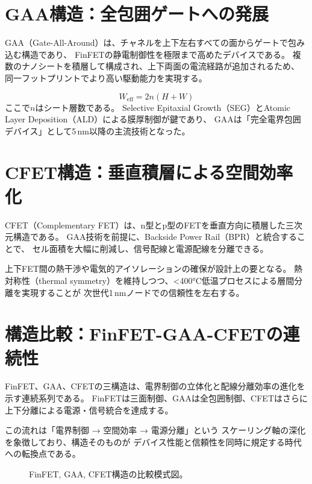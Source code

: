 \section{GAA構造：全包囲ゲートへの発展}
GAA（Gate-All-Around）は、チャネルを上下左右すべての面からゲートで包み込む構造であり、  
FinFETの静電制御性を極限まで高めたデバイスである。  
複数のナノシートを積層して構成され、上下両面の電流経路が追加されるため、  
同一フットプリントでより高い駆動能力を実現する。

\[
W_{\mathrm{eff}} = 2n(H + W)
\]
ここで$n$はシート層数である。  
Selective Epitaxial Growth（SEG）とAtomic Layer Deposition（ALD）による膜厚制御が鍵であり、  
GAAは「完全電界包囲デバイス」として5\,nm以降の主流技術となった。



\section{CFET構造：垂直積層による空間効率化}
CFET（Complementary FET）は、n型とp型のFETを垂直方向に積層した三次元構造である。  
GAA技術を前提に、Backside Power Rail（BPR）と統合することで、  
セル面積を大幅に削減し、信号配線と電源配線を分離できる。  

上下FET間の熱干渉や電気的アイソレーションの確保が設計上の要となる。  
熱対称性（thermal symmetry）を維持しつつ、<400°C低温プロセスによる層間分離を実現することが  
次世代1\,nmノードでの信頼性を左右する。



\section{構造比較：FinFET-GAA-CFETの連続性}
FinFET、GAA、CFETの三構造は、電界制御の立体化と配線分離効率の進化を示す連続系列である。  
FinFETは三面制御、GAAは全包囲制御、CFETはさらに上下分離による電源・信号統合を達成する。  

この流れは「電界制御 → 空間効率 → 電源分離」という  
スケーリング軸の深化を象徴しており、構造そのものが  
デバイス性能と信頼性を同時に規定する時代への転換点である。

\begin{figure}[t]
  \centering
  
  \caption{FinFET, GAA, CFET構造の比較模式図。}
\end{figure}
